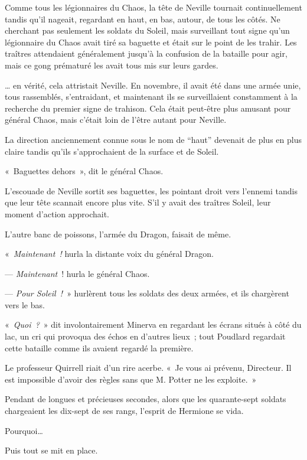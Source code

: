 Comme tous les légionnaires du Chaos, la tête de Neville tournait continuellement tandis qu'il nageait, regardant en haut, en bas, autour, de tous les côtés. Ne cherchant pas seulement les soldats du Soleil, mais surveillant tout signe qu'un légionnaire du Chaos avait tiré sa baguette et était sur le point de les trahir. Les traîtres attendaient généralement jusqu'à la confusion de la bataille pour agir, mais ce gong prématuré les avait tous mis sur leurs gardes.

… en vérité, cela attristait Neville. En novembre, il avait été dans une armée unie, tous rassemblés, s'entraidant, et maintenant ils se surveillaient constamment à la recherche du premier signe de trahison. Cela était peut-être plus amusant pour général Chaos, mais c'était loin de l'être autant pour Neville.

La direction anciennement connue sous le nom de “haut” devenait de plus en plus claire tandis qu'ils s'approchaient de la surface et de Soleil.

«~Baguettes dehors~», dit le général Chaos.

L'escouade de Neville sortit ses baguettes, les pointant droit vers l'ennemi tandis que leur tête scannait encore plus vite. S'il y avait des traîtres Soleil, leur moment d'action approchait.

L'autre banc de poissons, l'armée du Dragon, faisait de même.

«~\emph{Maintenant~!} hurla la distante voix du général Dragon.

--- \emph{Maintenant}~! hurla le général Chaos.

--- \emph{Pour Soleil~!}~» hurlèrent tous les soldats des deux armées, et ils chargèrent vers le bas.

\later

«~\emph{Quoi~?}~» dit involontairement Minerva en regardant les écrans situés à côté du lac, un cri qui provoqua des échos en d'autres lieux~; tout Poudlard regardait cette bataille comme ils avaient regardé la première.

Le professeur Quirrell riait d'un rire acerbe. «~Je vous ai prévenu, Directeur. Il est impossible d'avoir des règles sans que M. Potter ne les exploite.~»

\later

Pendant de longues et précieuses secondes, alors que les quarante-sept soldats chargeaient les dix-sept de ses rangs, l'esprit de Hermione se vida.

Pourquoi…

Puis tout se mit en place.

